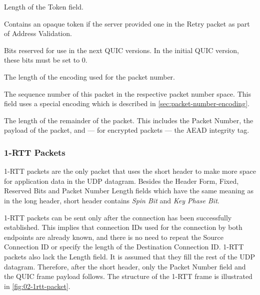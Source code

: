 \begin{description}

     Length of the Token field.

     Contains an opaque token if the server provided
    one in the Retry packet as part of Address Validation.

     Bits reserved for use in the next QUIC versions. In the initial QUIC
    version, these bits must be set to 0.

     The length of the encoding used for the packet number.

     The sequence number of this packet in the respective packet number space.
    This field uses a special encoding which is described in \autoref{sec:packet-number-encoding}.

     The length of the remainder of the packet. This includes the Packet Number,
    the payload of the packet, and --- for encrypted packets --- the AEAD integrity tag.

\end{description}

\subsubsection{1-RTT Packets}

1-RTT packets are the only packet that uses the short header to make more space for application data
in the UDP datagram. Besides the Header Form, Fixed, Reserved Bits and Packet Number Length fields
which have the same meaning as in the long header, short header contains \textit{Spin Bit} and
\textit{Key Phase Bit}.

1-RTT packets can be sent only after the connection has been successfully established. This implies
that connection IDs used for the connection by both endpoints are already known, and there is no
need to repeat the Source Connection ID or specify the length of the Destination Connection ID.
1-RTT packets also lack the Length field. It is assumed that they fill the rest of the UDP datagram.
Therefore, after the short header, only the Packet Number field and the QUIC frame payload follows.
The structure of the 1-RTT frame is illustrated in \autoref{fig:02-1rtt-packet}.

